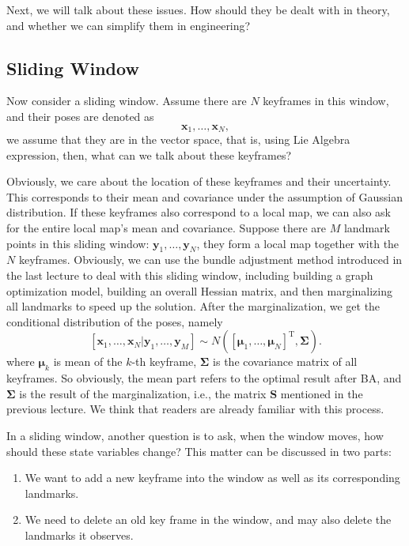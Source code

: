 Next, we will talk about these issues. How should they be dealt with in theory, and whether we can simplify them in engineering?

\subsection{Sliding Window}
Now consider a sliding window. Assume there are $N$ keyframes in this window, and their poses are denoted as $$\bm{x}_1, \ldots, \bm{x}_N,$$ we assume that they are in the vector space, that is, using Lie Algebra expression, then, what can we talk about these keyframes?

Obviously, we care about the location of these keyframes and their uncertainty. This corresponds to their mean and covariance under the assumption of Gaussian distribution. If these keyframes also correspond to a local map, we can also ask for the entire local map's mean and covariance. Suppose there are $M$ landmark points in this sliding window: $\bm{y}_1, \ldots, \bm{y}_N$, they form a local map together with the $N$ keyframes. Obviously, we can use the bundle adjustment method introduced in the last lecture to deal with this sliding window, including building a graph optimization model, building an overall Hessian matrix, and then marginalizing all landmarks to speed up the solution. After the marginalization, we get the conditional distribution of the poses, namely $$[\bm{x}_1, \ldots, \bm{x}_N | \bm{y}_1, \ldots, \bm{y}_M ] \sim N([\boldsymbol{\mu }_1, \ldots, \boldsymbol{\mu}_N]^\mathrm{T}, \boldsymbol{\Sigma}).$$ where $\boldsymbol{\mu}_k$ is mean of the $k$-th keyframe, $\boldsymbol{\Sigma}$ is the covariance matrix of all keyframes. So obviously, the mean part refers to the optimal result after BA, and $\boldsymbol{\Sigma}$ is the result of the marginalization, i.e., the matrix $\bm{S}$ mentioned in the previous lecture. We think that readers are already familiar with this process.

In a sliding window, another question is to ask, when the window moves, how should these state variables change? This matter can be discussed in two parts:

\begin{enumerate}
	\item We want to add a new keyframe into the window as well as its corresponding landmarks.
	\item We need to delete an old key frame in the window, and may also delete the landmarks it observes.
\end{enumerate}

